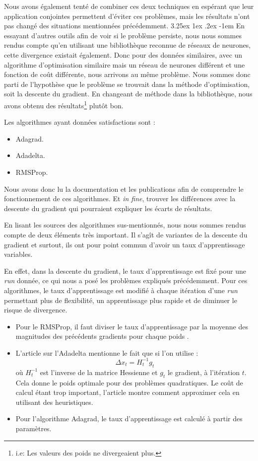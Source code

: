 \documentclass[a4paper, 11pt]{article}
\makeatletter
\renewcommand\paragraph{\@startsection{paragraph}{5}{\z@}%
  {3.25ex \@plus1ex \@minus.2ex}%
  {-1em}%
  {\normalfont\normalsize\bfseries}}
\makeatother
\begin{document}
Nous avons également tenté de combiner ces deux techniques en espérant que leur application conjointes permettent d'éviter ces problèmes, mais les
résultats n'ont pas changé des situations mentionnées précédemment.
\paragraph{}
En essayant d'autres outils afin de voir si le problème persiste, nous nous sommes rendus compte qu'en utilisant une bibliothèque reconnue de réseaux de 
neurones, cette divergence existait également. Donc pour des données similaires, avec un algorithme d'optimisation similaire mais un réseau de neurones
différent et une fonction de coût différente, nous arrivons au même problème.
Nous sommes donc parti de l'hypothèse que le problème se trouvait dans la méthode d'optimisation, soit la descente du gradient. En changeant de méthode
dans la bibliothèque, nous avons obtenu des résultats\footnote{i.e: Les valeurs des poids ne divergeaient plus.} plutôt bon.

Les algorithmes ayant données satisfactions sont \cite{keras}:
\begin{itemize}
 \item Adagrad.
 \item Adadelta.
 \item RMSProp.
\end{itemize}

  Nous avons donc lu la documentation et les publications afin de comprendre le fonctionnement de ces algorithmes. Et \textit{in fine}, trouver les 
  différences avec la descente du gradient qui pourraient expliquer les écarts de résultats.
  
  En lisant les sources des algorithmes sus-mentionnés, nous nous sommes rendus compte de deux éléments très important. Il s'agît de variantes de la
  descente du gradient et surtout, ils ont pour point commun d'avoir un taux d'apprentissage variables.
  
  En effet, dans la descente du gradient, le taux d'apprentissage est fixé pour une \textit{run} donnée, ce qui nous a posé les problèmes expliqués précédemment.
  Pour ces algorithmes, le taux d'apprentissage est modifié à chaque itération d'une \textit{run} permettant plus de flexibilité, un apprentissage plus 
  rapide et de diminuer le risque de divergence.
  \begin{itemize}
   \item Pour le RMSProp, il faut diviser le taux d'apprentissage par la moyenne des magnitudes des précédents gradients pour chaque poids \cite{rmsprop}.
   \item L'article sur l'Adadelta mentionne le fait que si l'on utilise \cite{adadelta}:
   $$\Delta x_t = H_t^{-1}g_t$$
   où $H_t^{-1}$ est l'inverse de la matrice Hessienne et $g_t$ le gradient, à l'itération $t$. Cela donne le poids optimale pour des problèmes quadratiques.
   Le coût de calcul étant trop important, l'article montre comment approximer cela en utilisant des heuristiques.
   \item Pour l'algorithme Adagrad, le taux d'apprentissage est calculé à partir des paramètres.
  \end{itemize}
\end{document}
